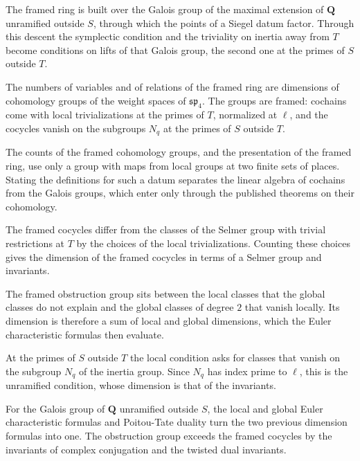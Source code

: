 The framed ring is built over the Galois group of the maximal extension of $\mathbf Q$ unramified outside $S$, through which the points of a Siegel datum factor. Through this descent the symplectic condition and the triviality on inertia away from $T$ become conditions on lifts of that Galois group, the second one at the primes of $S$ outside $T$.

The numbers of variables and of relations of the framed ring are dimensions of cohomology groups of the weight spaces of $\mathfrak{sp}_4$. The groups are framed: cochains come with local trivializations at the primes of $T$, normalized at $\ell$, and the cocycles vanish on the subgroups $N_q$ at the primes of $S$ outside $T$.

The counts of the framed cohomology groups, and the presentation of the framed ring, use only a group with maps from local groups at two finite sets of places. Stating the definitions for such a datum separates the linear algebra of cochains from the Galois groups, which enter only through the published theorems on their cohomology.

The framed cocycles differ from the classes of the Selmer group with trivial restrictions at $T$ by the choices of the local trivializations. Counting these choices gives the dimension of the framed cocycles in terms of a Selmer group and invariants.

The framed obstruction group sits between the local classes that the global classes do not explain and the global classes of degree $2$ that vanish locally. Its dimension is therefore a sum of local and global dimensions, which the Euler characteristic formulas then evaluate.

At the primes of $S$ outside $T$ the local condition asks for classes that vanish on the subgroup $N_q$ of the inertia group. Since $N_q$ has index prime to $\ell$, this is the unramified condition, whose dimension is that of the invariants.

For the Galois group of $\mathbf Q$ unramified outside $S$, the local and global Euler characteristic formulas and Poitou-Tate duality turn the two previous dimension formulas into one. The obstruction group exceeds the framed cocycles by the invariants of complex conjugation and the twisted dual invariants.

